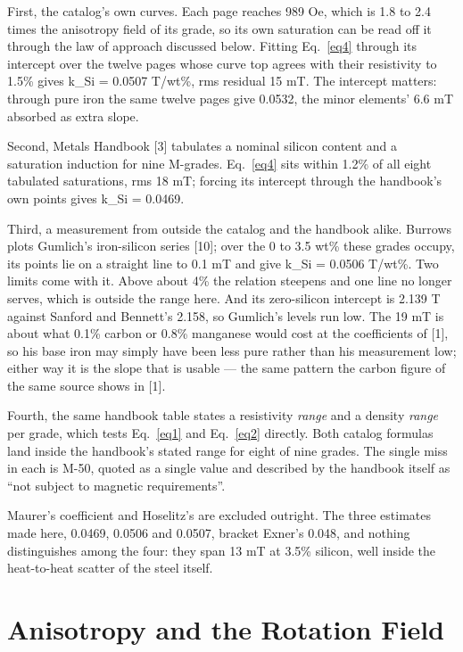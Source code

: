 \documentclass[
  11pt,
]{article}
\begin{document}
First, the catalog's own curves. Each page reaches 989 Oe, which is 1.8 to 2.4 times the anisotropy field of its grade, so its own saturation can be read off it through the law of approach discussed below. Fitting Eq.~\eqref{eq4} through its intercept over the twelve pages whose curve top agrees with their resistivity to 1.5\% gives k\_Si = 0.0507 T/wt\%, rms residual 15 mT. The intercept matters: through pure iron the same twelve pages give 0.0532, the minor elements' 6.6 mT absorbed as extra slope.

Second, Metals Handbook {[}3{]} tabulates a nominal silicon content and a saturation induction for nine M-grades. Eq.~\eqref{eq4} sits within 1.2\% of all eight tabulated saturations, rms 18 mT; forcing its intercept through the handbook's own points gives k\_Si = 0.0469.

Third, a measurement from outside the catalog and the handbook alike. Burrows plots Gumlich's iron-silicon series {[}10{]}; over the 0 to 3.5 wt\% these grades occupy, its points lie on a straight line to 0.1 mT and give k\_Si = 0.0506 T/wt\%. Two limits come with it. Above about 4\% the relation steepens and one line no longer serves, which is outside the range here. And its zero-silicon intercept is 2.139 T against Sanford and Bennett's 2.158, so Gumlich's levels run low. The 19 mT is about what 0.1\% carbon or 0.8\% manganese would cost at the coefficients of {[}1{]}, so his base iron may simply have been less pure rather than his measurement low; either way it is the slope that is usable --- the same pattern the carbon figure of the same source shows in {[}1{]}.

Fourth, the same handbook table states a resistivity \emph{range} and a density \emph{range} per grade, which tests Eq.~\eqref{eq1} and Eq.~\eqref{eq2} directly. Both catalog formulas land inside the handbook's stated range for eight of nine grades. The single miss in each is M-50, quoted as a single value and described by the handbook itself as ``not subject to magnetic requirements''.

Maurer's coefficient and Hoselitz's are excluded outright. The three estimates made here, 0.0469, 0.0506 and 0.0507, bracket Exner's 0.048, and nothing distinguishes among the four: they span 13 mT at 3.5\% silicon, well inside the heat-to-heat scatter of the steel itself.

\section{Anisotropy and the Rotation
Field}\label{anisotropy-and-the-rotation-field}
\end{document}
